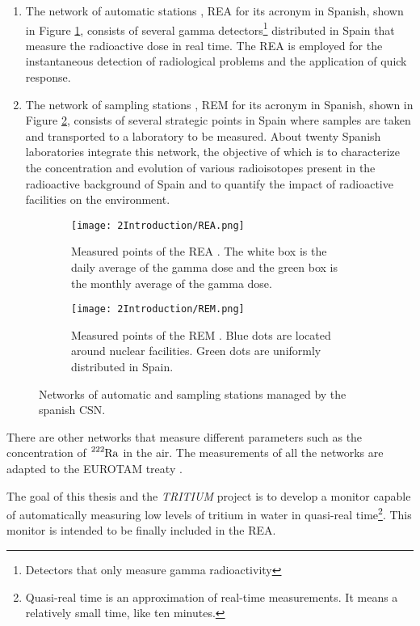 \begin{enumerate}
\begin{enumerate}
\item{} The network of automatic stations \cite{REA}, REA for its acronym in Spanish, shown in Figure \ref{subfig:REA}, consists of several gamma detectors\footnote{Detectors that only measure gamma radioactivity} distributed in Spain that measure the radioactive dose in real time. The REA is employed for the instantaneous detection of radiological problems and the application of quick response.

\item{} The network of sampling stations \cite{REM}, REM for its acronym in Spanish, shown in Figure \ref{subfig:REM}, consists of several strategic points in Spain where samples are taken and transported to a laboratory to be measured. About twenty Spanish laboratories integrate this network, the objective of which is to characterize the concentration and evolution of various radioisotopes present in the radioactive background of Spain and to quantify the impact of radioactive facilities on the environment.
\end{enumerate}

\begin{figure}
\centering
    \begin{subfigure}[b]{0.45\textwidth}
    \centering
    \texttt{[image: 2Introduction/REA.png]}  
        \caption{Measured points of the REA \cite{REA}. The white box is the daily average of the gamma dose and the green box is the monthly average of the gamma dose.}\label{subfig:REA}
    \end{subfigure}
    \hfill
    \begin{subfigure}[b]{0.45\textwidth}
    \centering
    \texttt{[image: 2Introduction/REM.png]}  
    \caption{Measured points of the REM \cite{REM}. Blue dots are located around nuclear facilities. Green dots are uniformly distributed in Spain.\label{subfig:REM}}
    \end{subfigure}
 \caption{Networks of automatic and sampling stations managed by the spanish CSN.}
 \label{fig:NetworksCSN}
\end{figure}

There are other networks that measure different parameters such as the concentration of $\ce{^{222}Ra}$ in the air. The measurements of all the networks are adapted to the EUROTAM treaty \cite{100BqL}.
\end{enumerate}

The goal of this thesis and the \textit{TRITIUM} project is to develop a monitor capable of automatically measuring low levels of tritium in water in quasi-real time\footnote{Quasi-real time is an approximation of real-time measurements. It means a relatively small time, like ten minutes.}. This monitor is intended to be finally included in the REA.

